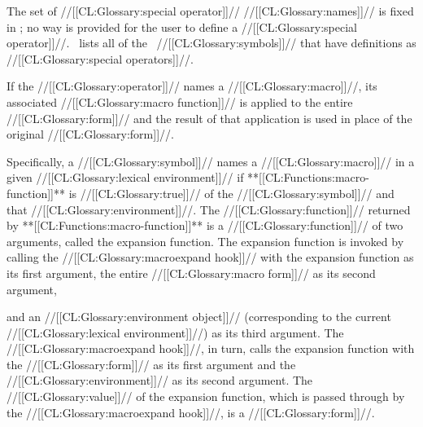 The set of //[[CL:Glossary:special operator]]// //[[CL:Glossary:names]]// is fixed in \clisp;  no way is provided for the user to define a //[[CL:Glossary:special operator]]//. \Thenextfigure\ lists all of the \clisp\ //[[CL:Glossary:symbols]]// that have definitions as //[[CL:Glossary:special operators]]//.


    

\endsubsubsubsubsection%


If the //[[CL:Glossary:operator]]// names a //[[CL:Glossary:macro]]//, its associated //[[CL:Glossary:macro function]]// is applied to the entire //[[CL:Glossary:form]]// and the result of that application is used in place of the original //[[CL:Glossary:form]]//.

Specifically, a //[[CL:Glossary:symbol]]// names a //[[CL:Glossary:macro]]// in a given //[[CL:Glossary:lexical environment]]// if **[[CL:Functions:macro-function]]** is //[[CL:Glossary:true]]// of the  //[[CL:Glossary:symbol]]// and that //[[CL:Glossary:environment]]//. The //[[CL:Glossary:function]]// returned by **[[CL:Functions:macro-function]]** is a //[[CL:Glossary:function]]// of two arguments, called the expansion function. The expansion function is invoked by calling the //[[CL:Glossary:macroexpand hook]]// with
      the expansion function as its first argument,
      the entire //[[CL:Glossary:macro form]]// as its second argument,

    and an //[[CL:Glossary:environment object]]// (corresponding to the current //[[CL:Glossary:lexical environment]]//)
      as its third argument. The //[[CL:Glossary:macroexpand hook]]//, in turn, calls the expansion function with the //[[CL:Glossary:form]]// as its first argument and the //[[CL:Glossary:environment]]// as its second argument. The //[[CL:Glossary:value]]// of the expansion function, which is passed through by the //[[CL:Glossary:macroexpand hook]]//, is a //[[CL:Glossary:form]]//. 

